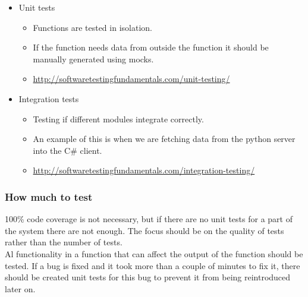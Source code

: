 \begin{itemize}
    \item Unit tests
        \begin{itemize}
            \item Functions are tested in isolation.
            \item If the function needs data from outside the function it should be manually generated using mocks.
            \item \url{http://softwaretestingfundamentals.com/unit-testing/}
        \end{itemize}
    \item Integration tests
        \begin{itemize}
            \item Testing if different modules integrate correctly.
            \item An example of this is when we are fetching data from the python server into the C\# client.
            \item \url{http://softwaretestingfundamentals.com/integration-testing/}
        \end{itemize}
\end{itemize}

\subsubsection{How much to test}
100\% code coverage is not necessary, but if there are no unit tests for a part of the system there are not enough. 
The focus should be on the quality of tests rather than the number of tests.
\\
Al functionality in a function that can affect the output of the function should be tested.
If a bug is fixed and it took more than a couple of minutes to fix it, there should be created unit tests for this bug to prevent it from being reintroduced later on.
